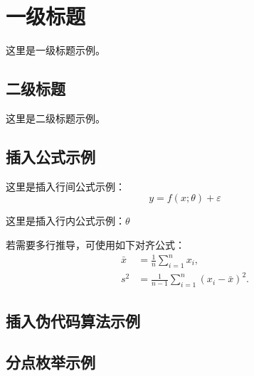 \documentclass[exp]{hitrep}
\author{学生姓名}
\begin{document}
\maketitle
\toc
\newpage



\section{一级标题}
这里是一级标题示例。
\subsection{二级标题}
这里是二级标题示例。



\subsection{插入公式示例}
这里是插入行间公式示例：
\begin{equation}
    y = f(x;\theta) + \varepsilon
    \label{eq:template-model}
\end{equation}

这里是插入行内公式示例：\(\theta\)

若需要多行推导，可使用如下对齐公式：
\begin{align}
    \bar{x} &= \frac{1}{n}\sum_{i=1}^{n}x_i, \label{eq:mean}\\
    s^2 &= \frac{1}{n-1}\sum_{i=1}^{n}(x_i-\bar{x})^2. \label{eq:variance}
\end{align}

\subsection{插入伪代码算法示例}

\begin{algorithm}[H]
    \caption{实验流程示例}
    \label{alg:template-procedure}
\end{algorithm}

\subsection{分点枚举示例}
\end{document}
